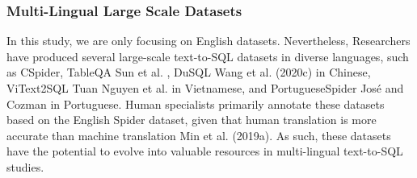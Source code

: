 \subsubsection{Multi-Lingual Large Scale Datasets}

In this study, we are only focusing on English datasets. Nevertheless, Researchers have produced several large-scale text-to-SQL datasets in diverse languages, such as CSpider\cite{min-etal-2019-pilot}, TableQA Sun et al. \cite{DBLP:journals/corr/abs-2006-06434}, DuSQL Wang et al. (2020c) \cite{wang-etal-2020-dusql} in Chinese, ViText2SQL Tuan Nguyen et al. \cite{tuan-nguyen-etal-2020-pilot} in Vietnamese, and PortugueseSpider José and Cozman  in Portuguese\cite{DBLP:journals/corr/abs-2110-03546}. Human specialists primarily annotate these datasets based on the English Spider dataset, given that human translation is more accurate than machine translation Min et al. (2019a)\cite{min-etal-2019-pilot}. As such, these datasets have the potential to evolve into valuable resources in multi-lingual text-to-SQL studies.
